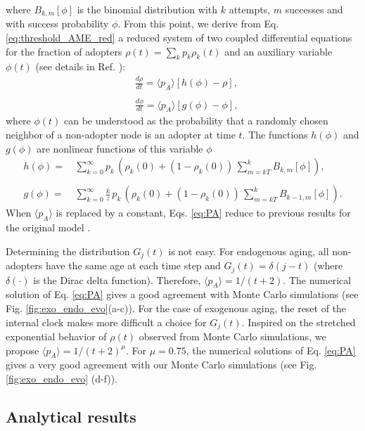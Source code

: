 where $B_{k,m}[\phi]$ is the binomial distribution with $k$ attempts, $m$ successes and with success probability $\phi$. From this point, we derive from Eq. \eqref{eq:threshold_AME_red} a reduced system of two coupled differential equations for the fraction of adopters $\rho(t) = \sum_k p_k \rho_k (t)$ and an auxiliary variable $\phi (t)$ (see details in Ref. \cite{gleeson-2013}):
\begin{align}
    \label{eq:PA}
        & \frac{d \rho}{dt} = \langle p_A \rangle [ h(\phi) - \rho ], \nonumber\\
        \\
        & \frac{d \phi}{dt} = \langle p_A \rangle [ g(\phi) - \phi ], \nonumber
\end{align}
where $\phi(t)$ can be understood as the probability that a randomly chosen neighbor of a non-adopter node is an adopter at time $t$. The functions $h(\phi)$ and $g(\phi)$ are nonlinear functions of this variable $\phi$
\begin{align}
    h (\phi)  = & \,  \sum_{k=0}^{\infty} p_k\,  \left( \rho_k (0) + (1 - \rho_k (0))\,  \sum_{m = kT}^{k} B_{k,m}[\phi]\right),\nonumber\\
    \\
    g (\phi)  = & \, \sum_{k=0}^{\infty} \frac{k}{z}\,  p_k \,  \left( \rho_k (0) + (1 - \rho_k (0)) \, \sum_{m = kT}^{k} B_{k-1,m}[\phi]\right). \nonumber
\end{align}
 When $\langle p_A \rangle$ is replaced by a constant, Eqs. \eqref{eq:PA} reduce to previous results for the original model \cite{gleeson-2008}.
 
Determining the distribution $G_j (t)$ is not easy. For endogenous aging, all non-adopters have the same age at each time step and $G_j (t) = \delta(j-t)$ (where $\delta(\cdot)$ is the Dirac delta function). Therefore, $\langle p_A \rangle = 1/(t+2)$. The numerical solution of Eq. \eqref{eq:PA} gives a good agreement with Monte Carlo simulations (see Fig. \ref{fig:exo_endo_evo}(a-c)). For the case of exogenous aging, the reset of the internal clock makes more difficult a choice for $G_j (t)$.  Inspired on the stretched exponential behavior of $\rho(t)$ observed from Monte Carlo simulations, we propose $\langle p_A \rangle = 1/(t+2)^\mu$. For $\mu = 0.75$, the numerical solutions of Eq. \eqref{eq:PA} gives a very good agreement with our Monte Carlo simulations (see Fig. \ref{fig:exo_endo_evo} (d-f)).

\subsection{\label{subsec Analytical results} Analytical results}


